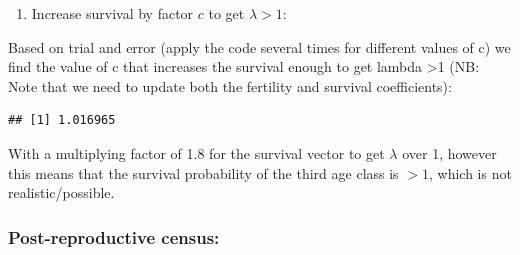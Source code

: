 \documentclass[
]{book}
\newenvironment{Shaded}{\begin{snugshade}}{\end{snugshade}}
\newcommand{\AttributeTok}[1]{\textcolor[rgb]{0.77,0.63,0.00}{#1}}
\newcommand{\CommentTok}[1]{\textcolor[rgb]{0.56,0.35,0.01}{\textit{#1}}}
\newcommand{\DecValTok}[1]{\textcolor[rgb]{0.00,0.00,0.81}{#1}}
\newcommand{\FloatTok}[1]{\textcolor[rgb]{0.00,0.00,0.81}{#1}}
\newcommand{\FunctionTok}[1]{\textcolor[rgb]{0.00,0.00,0.00}{#1}}
\newcommand{\NormalTok}[1]{#1}
\newcommand{\OtherTok}[1]{\textcolor[rgb]{0.56,0.35,0.01}{#1}}
\newcommand{\SpecialCharTok}[1]{\textcolor[rgb]{0.00,0.00,0.00}{#1}}
\providecommand{\tightlist}{%
  \setlength{\itemsep}{0pt}\setlength{\parskip}{0pt}}
\begin{document}
\begin{enumerate}
\def\labelenumi{\arabic{enumi}.}
\setcounter{enumi}{7}
\tightlist
\item
  Increase survival by factor \(c\) to get \(\lambda>1\):
\end{enumerate}

Based on trial and error (apply the code several times for different values of c) we find the value of c that increases the survival enough to get lambda \textgreater1 (NB: Note that we need to update both the fertility and survival coefficients):

\begin{Shaded}
\end{Shaded}

\begin{verbatim}
## [1] 1.016965
\end{verbatim}

With a multiplying factor of 1.8 for the survival vector to get \(\lambda\) over 1, however this means that the survival probability of the third age class is \(>1\), which is not realistic/possible.

\hypertarget{post-reproductive-census-1}{%
\subsubsection*{Post-reproductive census:}\label{post-reproductive-census-1}}
\end{document}
